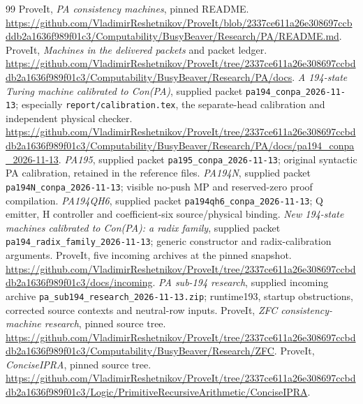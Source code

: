 \documentclass[11pt,letterpaper]{article}
\newcommand{\file}[1]{\nolinkurl{#1}}
\begin{document}
\begin{thebibliography}{99}
 ProveIt, \emph{PA consistency machines}, pinned README.
\url{https://github.com/VladimirReshetnikov/ProveIt/blob/2337ce611a26e308697ccbddb2a1636f989f01c3/Computability/BusyBeaver/Research/PA/README.md}.
 ProveIt, \emph{Machines in the delivered packets} and packet ledger.
\url{https://github.com/VladimirReshetnikov/ProveIt/tree/2337ce611a26e308697ccbddb2a1636f989f01c3/Computability/BusyBeaver/Research/PA/docs}.
 \emph{A 194-state Turing machine calibrated to Con(PA)}, supplied packet
\file{pa194_conpa_2026-11-13}; especially \file{report/calibration.tex},
the separate-head calibration and independent physical checker.
\url{https://github.com/VladimirReshetnikov/ProveIt/tree/2337ce611a26e308697ccbddb2a1636f989f01c3/Computability/BusyBeaver/Research/PA/docs/pa194_conpa_2026-11-13}.
 \emph{PA195}, supplied packet \file{pa195_conpa_2026-11-13};
original syntactic PA calibration, retained in the reference files.
 \emph{PA194N}, supplied packet \file{pa194N_conpa_2026-11-13};
visible no-push MP and reserved-zero proof compilation.
 \emph{PA194QH6}, supplied packet \file{pa194qh6_conpa_2026-11-13};
Q emitter, H controller and coefficient-six source/physical binding.
 \emph{New 194-state machines calibrated to Con(PA): a radix family},
supplied packet \file{pa194_radix_family_2026-11-13}; generic constructor and
radix-calibration arguments.
 ProveIt, five incoming archives at the pinned snapshot.
\url{https://github.com/VladimirReshetnikov/ProveIt/tree/2337ce611a26e308697ccbddb2a1636f989f01c3/docs/incoming}.
 \emph{PA sub-194 research}, supplied incoming archive
\file{pa_sub194_research_2026-11-13.zip}; runtime193, startup obstructions,
corrected source contexts and neutral-row inputs.
 ProveIt, \emph{ZFC consistency-machine research}, pinned source tree.
\url{https://github.com/VladimirReshetnikov/ProveIt/tree/2337ce611a26e308697ccbddb2a1636f989f01c3/Computability/BusyBeaver/Research/ZFC}.
 ProveIt, \emph{ConciseIPRA}, pinned source tree.
\url{https://github.com/VladimirReshetnikov/ProveIt/tree/2337ce611a26e308697ccbddb2a1636f989f01c3/Logic/PrimitiveRecursiveArithmetic/ConciseIPRA}.
\end{thebibliography}
\end{document}
